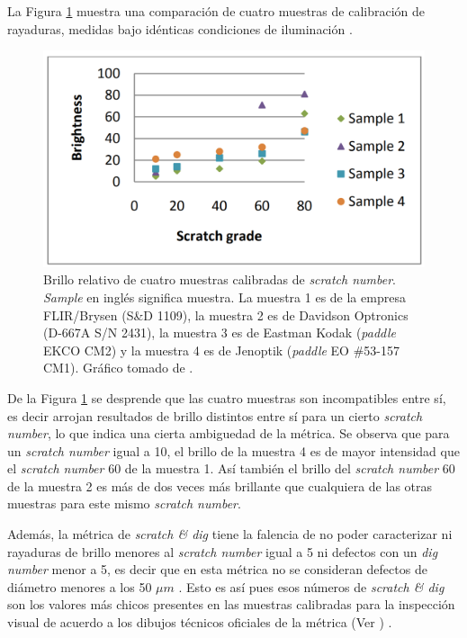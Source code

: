 La Figura \ref{fig:samplescratchs} muestra una comparación de cuatro muestras de calibración de rayaduras, medidas bajo idénticas condiciones de iluminación \cite{Aikens}.
\begin{figure}[H]
	\centering
	\includegraphics[scale=0.54]{Figs/cuantificaciondefectos/samplesscratch.png}
	\caption{Brillo relativo de cuatro muestras calibradas de \textit{scratch number}. \textit{Sample} en inglés significa muestra. La muestra 1 es de la empresa FLIR/Brysen (S\&D 1109), la muestra 2 es de Davidson Optronics (D-667A S/N 2431), la muestra 3 es de Eastman Kodak (\textit{paddle} EKCO CM2) y la muestra 4 es de Jenoptik (\textit{paddle} EO \#53-157 CM1). Gráfico tomado de \cite{Aikens}.}
	\label{fig:samplescratchs}
\end{figure}
De la Figura \ref{fig:samplescratchs} se desprende que las cuatro muestras son incompatibles entre sí, es decir arrojan resultados de brillo distintos entre sí para un cierto \textit{scratch number}, lo que indica una cierta ambiguedad de la métrica. Se observa que para un \textit{scratch number} igual a 10, el brillo de la muestra 4 es de mayor intensidad que el \textit{scratch number} 60 de la muestra 1.
Así también el brillo del \textit{scratch number} 60 de la muestra 2 es más de dos veces más brillante que cualquiera de las otras muestras para este mismo \textit{scratch number}.

Además, la métrica de \textit{scratch \& dig} tiene la falencia de no poder caracterizar ni rayaduras de brillo menores al \textit{scratch number} igual a 5 ni defectos con un \textit{dig number} menor a 5, es decir que en esta métrica no se consideran defectos de diámetro menores a los 50 $\mu m$ \cite{quentin}. Esto es así pues esos números de \textit{scratch \& dig} son los valores más chicos presentes en las muestras calibradas para la inspección visual de acuerdo a los dibujos técnicos oficiales de la métrica (Ver \cite{dibujito})  .

